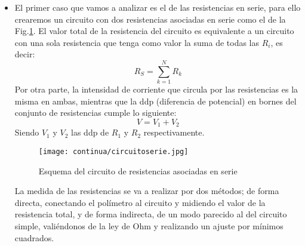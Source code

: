 \documentclass[a4paper,12pt,titlepage]{article}
\begin{document}
\begin{itemize}
    \item El primer caso que vamos a analizar es el de las resistencias en serie, para ello crearemos un circuito con dos resistencias asociadas en serie como el de la Fig.\ref{CircuitoSerie}. El valor total de la resistencia del circuito es equivalente a un circuito con una sola resistencia que tenga como valor la suma de todas las $R_{i}$, es decir:
        \begin{equation}
            R_{S}=\sum_{k=1}^NR_{k}
        \end{equation}
        Por otra parte, la intensidad de corriente que circula por las resistencias es la misma en ambas, mientras que la ddp (diferencia de potencial) en bornes del conjunto de resistencias cumple lo siguiente:
        \begin{equation}
            V=V_{1}+V_{2}
            \label{Formula V serie}
        \end{equation}
        Siendo $V_{1}$ y $V_{2}$ las ddp de $R_{1}$ y $R_{2}$ respectivamente.
        \begin{figure}[h!]
            \centering
            \texttt{[image: continua/circuitoserie.jpg]}
            \caption{Esquema del circuito de resistencias asociadas en serie}
            \label{CircuitoSerie}
        \end{figure}
    
    \par La medida de las resistencias se va a realizar por dos métodos; de forma directa, conectando el polímetro al circuito y midiendo el valor de la resistencia total, y de forma indirecta, de un modo parecido al del circuito simple, valiéndonos de la ley de Ohm y realizando un ajuste por mínimos cuadrados.
    

\end{itemize}
\end{document}
